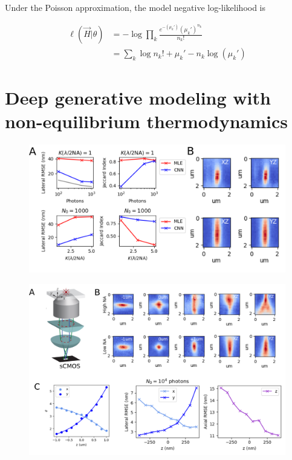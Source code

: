 \documentclass{ucetd}
\begin{document}
Under the Poisson approximation, the model negative log-likelihood is

\begin{align}
\ell(\vec{H}|\theta) &= -\log \prod_{k} \frac{e^{-\left(\mu_{k}'\right)}\left(\mu_{k}'\right)^{n_{k}}}{n_{k}!}\\
&= \sum_{k}  \log n_{k}! + \mu_{k}' - n_{k}\log\left(\mu_{k}'\right)
\end{align}


\section{Deep generative modeling with non-equilibrium thermodynamics}

\begin{figure}
\begin{center}
\includegraphics[width=16cm]{PSF2D.png}
\end{center}
\end{figure}

\begin{figure}
\begin{center}
\includegraphics[width=16cm]{Astigmatism.png}
\end{center}
\end{figure}
\end{document}
